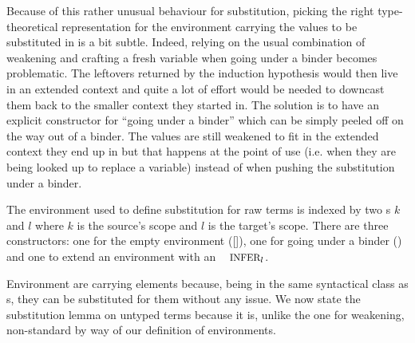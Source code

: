 Because of this rather unusual behaviour for substitution, picking
the right type-theoretical representation for the environment
carrying the values to be substituted in is a bit subtle. Indeed,
relying on the usual combination of weakening and crafting a fresh
variable when going under a binder becomes problematic. The leftovers
returned by the induction hypothesis would then live in an extended
context and quite a lot of effort would be needed to downcast them
back to the smaller context they started in. The solution is to have
an explicit constructor for ``going under a binder'' which can be
simply peeled off on the way out of a binder. The values are still
weakened to fit in the extended context they end up in but that happens
at the point of use (i.e. when they are being looked up to replace a
variable) instead of when pushing the substitution under a binder.

\begin{definition}The environment \Env{} used to define substitution
for raw terms is indexed by two \Nat{}s $k$ and $l$ where $k$ is the
source's scope and $l$ is the target's scope. There are three constructors:
one for the empty environment ([]), one for going under a binder (\envextend{})
and one to extend an environment with an $\Inferable{l}$.
\end{definition}

Environment are carrying \Inferable{} elements because, being in the
same syntactical class as \Var{}s, they can be substituted for them
without any issue. We now state the substitution lemma on untyped terms
because it is, unlike the one for weakening, non-standard by way of our
definition of environments.

